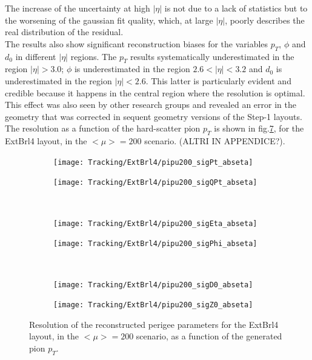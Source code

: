\documentclass[a4paper,twoside,12pt]{article}
\begin{document}
The increase of the uncertainty at high $|\eta|$ is not due to a lack of statistics but to the
worsening of the gaussian fit quality, which, at large $|\eta|$, poorly describes the real distribution of the residual.\\

The results also show significant reconstruction biases for the variables $p_{T}$, $\phi$ and $d_{0}$ in different $|\eta|$ regions. The $p_{T}$ results systematically underestimated in the region
$|\eta| > 3.0$; 	$\phi$ is underestimated in the region $2.6 < |\eta| < 3.2$ and $d_{0}$  is underestimated in the region $|\eta| < 2.6$. This latter is particularly evident and credible because
it happens in the central region where the resolution is optimal. This effect was also seen by other research groups and revealed an error in the geometry that was corrected in sequent geometry versions of the Step-1 layouts. 
The resolution as a function of the hard-scatter pion $p_{T}$ is shown in fig.\ref{fig:tracking:pionResolutionPt}, for the ExtBrl4 layout, in the $<\mu> = 200$ scenario. (ALTRI IN APPENDICE?).\\ 

\begin{figure}
\begin{subfigure}{.5\linewidth}
\texttt{[image: Tracking/ExtBrl4/pipu200\_sigPt\_abseta]}
\caption{}
\label{fig:tracking:pipu200_sigPt_abseta}
\end{subfigure}
\begin{subfigure}{.5\linewidth}
\texttt{[image: Tracking/ExtBrl4/pipu200\_sigQPt\_abseta]}
\caption{}
\label{fig:tracking:pipu200_sigQPt_abseta}
\end{subfigure}\\[1ex]
\begin{subfigure}{.5\linewidth}
\texttt{[image: Tracking/ExtBrl4/pipu200\_sigEta\_abseta]}
\caption{}
\label{fig:tracking:pipu200_sigEta_abseta}
\end{subfigure}
\begin{subfigure}{.5\linewidth}
\texttt{[image: Tracking/ExtBrl4/pipu200\_sigPhi\_abseta]}
\caption{}
\label{fig:tracking:pipu200_sigPhi_abseta}
\end{subfigure}\\[1ex]
\begin{subfigure}{.5\linewidth}
\texttt{[image: Tracking/ExtBrl4/pipu200\_sigD0\_abseta]}
\caption{}
\label{fig:tracking:pipu200_sigD0_abseta}
\end{subfigure}
\begin{subfigure}{.5\linewidth}
\texttt{[image: Tracking/ExtBrl4/pipu200\_sigZ0\_abseta]}
\caption{}
\label{fig:tracking:pipu200_sigZ0_abseta}
\end{subfigure}
\caption{Resolution of the reconstructed perigee parameters for the ExtBrl4 layout, in the $<\mu> = 200$ scenario, as a function of the generated pion $p_{T}$.}
\label{fig:tracking:pionResolutionPt}
\end{figure}
\end{document}
